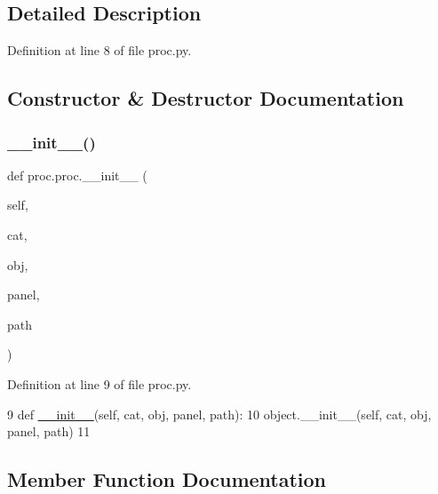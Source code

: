 \subsection{Detailed Description}


Definition at line 8 of file proc.\+py.



\subsection{Constructor \& Destructor Documentation}
\mbox{\label{classproc_1_1proc_ab5b9673d3e2e83cf26267f39055153f3}} 
\subsubsection{\texorpdfstring{\+\_\+\+\_\+init\+\_\+\+\_\+()}{\_\_init\_\_()}}
{\footnotesize\ttfamily def proc.\+proc.\+\_\+\+\_\+init\+\_\+\+\_\+ (\begin{DoxyParamCaption}\item[{}]{self,  }\item[{}]{cat,  }\item[{}]{obj,  }\item[{}]{panel,  }\item[{}]{path }\end{DoxyParamCaption})}



Definition at line 9 of file proc.\+py.


\begin{DoxyCode}
9     \textcolor{keyword}{def }\hyperlink{classwrapper_1_1ModuleDictWrapper_a9a7a794150502f51df687831583e13b9}{\_\_init\_\_}(self, cat, obj, panel, path):
10         object.\_\_init\_\_(self, cat, obj, panel, path)
11         
\end{DoxyCode}


\subsection{Member Function Documentation}
\mbox{\label{classobject_1_1object_a54a55487254a96ed2fe367439c41391f}} 
